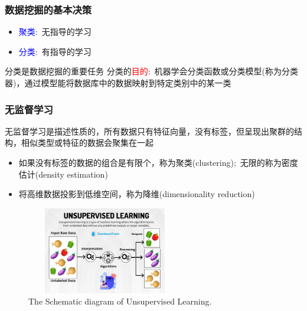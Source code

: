 \frame
{
	\frametitle{数据挖掘的基本决策}
\begin{itemize}
	\item \textcolor{blue}{聚类}:~无指导的学习
	\item \textcolor{blue}{分类}:~有指导的学习
\end{itemize}
分类是数据挖掘的重要任务
\vskip 2pt
分类的\textcolor{red}{目的}:~机器学会分类函数或分类模型(称为分类器)，通过模型能将数据库中的数据映射到特定类别中的某一类

\begin{figure}[h!]
\centering
\vspace*{-7pt}
\label{ML_classification-animate}
\end{figure}
}

\frame
{
	\frametitle{无监督学习}
无监督学习是描述性质的，所有数据只有特征向量，没有标签，但呈现出聚群的结构，相似类型或特征的数据会聚集在一起
\begin{itemize}
	\item 如果没有标签的数据的组合是有限个，称为聚类\textrm{(clustering)};~无限的称为密度估计\textrm{(density estimation)}
	\item 将高维数据投影到低维空间，称为降维\textrm{(dimensionality reduction)}
		\vskip 2pt
		{\fontsize{8.0pt}{4.2pt}\selectfont{降维有助于了解复杂数数据的检测模式}}
\end{itemize}
\begin{figure}[h!]
\centering
\vspace*{-0.1in}
\includegraphics[height=1.5in,width=2.7in,viewport=0 0 1075 720,clip]{Figures/ML_Unsupervised-Learning.jpg}
\caption{\tiny{\textrm{The Schematic diagram of Unsupervised Learning.}}}%
\label{ML_Unsupervised-Learning}
\end{figure}
}

